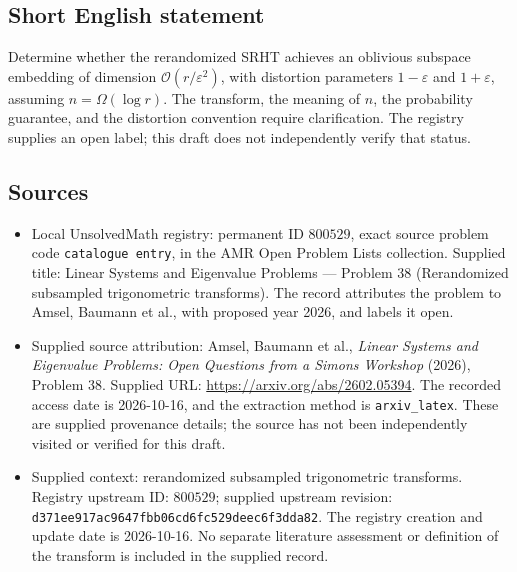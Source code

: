 \documentclass[11pt]{article}
\begin{document}
\subsection{Short English statement}
Determine whether the rerandomized SRHT achieves an oblivious subspace embedding of dimension \(\mathcal O(r/\varepsilon^2)\), with distortion parameters \(1-\varepsilon\) and \(1+\varepsilon\), assuming \(n=\Omega(\log r)\). The transform, the meaning of \(n\), the probability guarantee, and the distortion convention require clarification. The registry supplies an open label; this draft does not independently verify that status.
\subsection{Sources}
\begin{itemize}
\item Local UnsolvedMath registry: permanent ID \(800529\), exact source problem code \texttt{catalogue entry}, in the AMR Open Problem Lists collection. Supplied title: Linear Systems and Eigenvalue Problems --- Problem 38 (Rerandomized subsampled trigonometric transforms). The record attributes the problem to Amsel, Baumann et al., with proposed year 2026, and labels it open.
\item Supplied source attribution: Amsel, Baumann et al., \emph{Linear Systems and Eigenvalue Problems: Open Questions from a Simons Workshop} (2026), Problem 38. Supplied URL: \url{https://arxiv.org/abs/2602.05394}. The recorded access date is 2026-10-16, and the extraction method is \texttt{arxiv\_latex}. These are supplied provenance details; the source has not been independently visited or verified for this draft.
\item Supplied context: rerandomized subsampled trigonometric transforms. Registry upstream ID: \(800529\); supplied upstream revision: \texttt{d371ee917ac9647fbb06cd6fc529deec6f3dda82}. The registry creation and update date is 2026-10-16. No separate literature assessment or definition of the transform is included in the supplied record.
\end{itemize}
\end{document}
